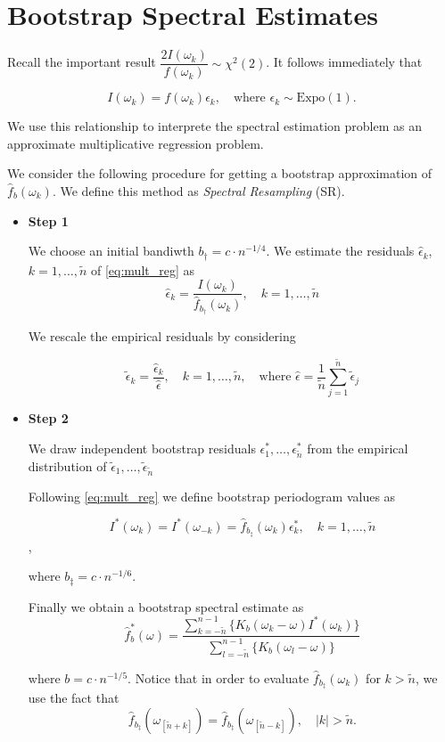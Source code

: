 \documentclass{article}\usepackage[]{graphicx}\usepackage[]{color}
\begin{document}
\section{Bootstrap Spectral Estimates}

Recall the important result $\dfrac{2 I(\omega_k)}{f(\omega_k)} \sim \chi^2(2) $. It follows immediately that

\begin{equation}
\label{eq:mult_reg}
I(\omega_k) = f(\omega_k) \epsilon_k, \quad \text{where } \epsilon_k \sim \text{Expo}(1).
\end{equation}

We use this relationship to interprete the spectral estimation problem as an approximate multiplicative regression problem.

We consider the following procedure for getting a bootstrap approximation of $\hat{f}_b(\omega_k)$. We define this method as \textit{Spectral Resampling} (SR).

\begin{itemize}

\item \textbf{Step 1}

We choose an initial bandiwth $b_{\dagger} = c \cdot n^{-1/4}$. We estimate the residuals $\hat{\epsilon}_k$, $k = 1,\dots, \tilde{n}$ of \ref{eq:mult_reg} as $$ \hat{\epsilon}_k = \dfrac{I(\omega_k)}{\hat{f}_{b_{\dagger}}(\omega_k)}, \quad k = 1, \dots, \tilde{n}$$


We rescale the empirical residuals by considering

$$ \tilde{\epsilon}_k =  \dfrac{\hat{\epsilon}_k}{\hat{\epsilon}}, \quad k = 1, \dots, \tilde{n}, \quad \text{where  } \hat{\epsilon} = \frac{1}{\tilde{n}} \sum_{j = 1}^{\tilde{n}} \tilde{\epsilon}_j$$

\item \textbf{Step 2}

We draw independent bootstrap residuals $\epsilon_1^{*}, \dots, \epsilon_{\tilde{n}}^{*}$ from the empirical distribution of $\tilde{\epsilon}_1, \dots, \tilde{\epsilon}_{\tilde{n}}$

Following \ref{eq:mult_reg} we define bootstrap periodogram values as

$$I^{*}(\omega_k) = I^{*}(\omega_{-k}) = \hat{f}_{b_{\ddagger}}(\omega_k) \epsilon^{*}_k, \quad k = 1, \dots, \tilde{n}$$,

where $b_{\ddagger} = c \cdot n^{-1/6}$. 

Finally we obtain a bootstrap spectral estimate as 
$$ \hat{f}^{*}_{b} (\omega) = \dfrac{\sum_{k = -\tilde{n}}^{n - 1} \Big\{ K_b(\omega_k - \omega) I^{*}(\omega_k) \Big\}}{\sum_{l = -\tilde{n}}^{n - 1} \Big\{ K_b(\omega_l - \omega) \Big\}} $$

where $b = c \cdot n^{-1/5}$. Notice that in order to evaluate $\hat{f}_{b_{\ddagger}}(\omega_k)$ for $k > \tilde{n}$, we use the fact that $$\hat{f}_{b_{\ddagger}}(\omega_{[\tilde{n} + k]}) = \hat{f}_{b_{\ddagger}}(\omega_{[\tilde{n} - k]}), \quad |k| > \tilde{n}.$$
\end{itemize}
\end{document}
